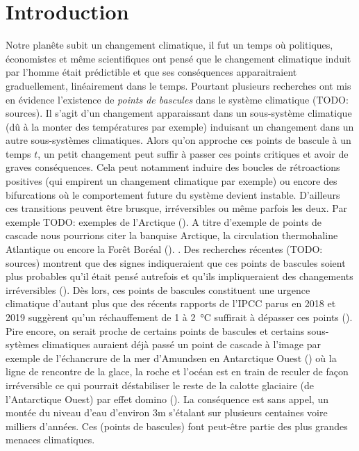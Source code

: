 \section{Introduction}

Notre planête subit un changement climatique, il fut un temps où politiques, économistes et même scientifiques ont pensé que le changement climatique induit par l'homme était prédictible et que ses conséquences apparaitraient graduellement, linéairement dans le temps. Pourtant plusieurs recherches ont mis en évidence l'existence de \emph{points de bascules} dans le système climatique (TODO: sources). Il s'agit d'un changement apparaissant dans un sous-système climatique (dû à la monter des températures par exemple) induisant un changement dans un autre sous-systèmes climatiques. Alors qu'on approche ces points de bascule à un temps $t$, un petit changement peut suffir à passer ces points critiques et avoir de graves conséquences. Cela peut notamment induire des boucles de rétroactions positives (qui empirent un changement climatique par exemple) ou encore des bifurcations où le comportement  future du système devient instable. D'ailleurs ces transitions peuvent être brusque, irréversibles ou même parfois les deux. Par exemple TODO: exemples de l'Arctique (\cite{Lenton_2012}). A titre d'exemple de points de cascade nous pourrions citer la banquise Arctique, la circulation thermohaline Atlantique ou encore la Forêt Boréal (\cite{lenton_tipping_2008}). . Des recherches récentes (TODO: sources) montrent que des signes indiqueraient que ces points de bascules soient plus probables qu'il était pensé autrefois et qu'ils impliqueraient des changements irréversibles (\cite{lenton_climate_2019_too_risky}). Dès lors, ces points de bascules constituent une urgence climatique d'autant plus que des récents rapports de l'IPCC parus en 2018 et 2019 suggèrent qu'un réchauffement de 1 à \SI{2}{\celsius} suffirait à dépasser ces points (\cite{ipcc_global_2018,portner_ipcc_2019}). Pire encore, on serait proche de certains points de bascules et certains sous-sytèmes climatiques auraient déjà passé un point de cascade à l'image par exemple de l'échancrure de la mer d'Amundsen en Antarctique Ouest (\cite{portner_ipcc_2019}) où la ligne de rencontre de la glace, la roche et l'océan est en train de reculer de façon irréversible ce qui pourrait déstabiliser le reste de la calotte glaciaire (de l'Antarctique Ouest) par effet domino (\cite{feldmann_collapse_2015_amundsen}). La conséquence est sans appel, un montée du niveau d'eau d'environ 3m s'étalant sur plusieurs centaines voire milliers d'années. Ces (points de bascules) font peut-être partie des plus grandes menaces climatiques.

